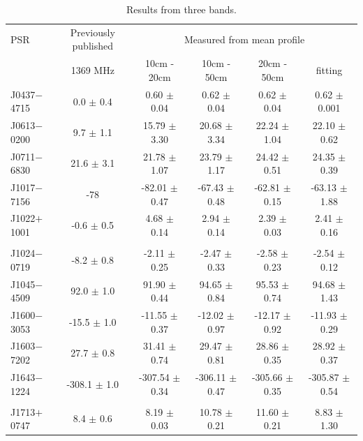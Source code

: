 \documentclass[useAMS,usenatbib]{mn2e}
\begin{document}
\begin{table}
\centering
\caption{Results from three bands.}
\label{rm}
\begin{tabular}{lccccc}
\hline
PSR          &    Previously published     &    \multicolumn{4}{c}{Measured from mean profile}       \\  
             &    1369 MHz                 &    10cm - 20cm  &  10cm - 50cm   &  20cm - 50cm   &    fitting      \\   
\hline
J0437$-$4715 & 0.0    $\pm$ 0.4  & 0.60    $\pm$ 0.04 & 0.62    $\pm$ 0.04 & 0.62    $\pm$ 0.04 & 0.62    $\pm$ 0.001   \\  
J0613$-$0200 & 9.7    $\pm$ 1.1  & 15.79   $\pm$ 3.30 & 20.68   $\pm$ 3.34 & 22.24   $\pm$ 1.04 & 22.10   $\pm$ 0.62    \\  
J0711$-$6830 & 21.6   $\pm$ 3.1  & 21.78   $\pm$ 1.07 & 23.79   $\pm$ 1.17 & 24.42   $\pm$ 0.51 & 24.35   $\pm$ 0.39    \\  
J1017$-$7156 & -78               & -82.01  $\pm$ 0.47 & -67.43  $\pm$ 0.48 & -62.81  $\pm$ 0.15 & -63.13  $\pm$ 1.88   \\
J1022$+$1001 & -0.6   $\pm$ 0.5  & 4.68    $\pm$ 0.14 & 2.94    $\pm$ 0.14 & 2.39    $\pm$ 0.03 & 2.41    $\pm$ 0.16    \\  
             &                   &                    &                    &                    &                       \\
J1024$-$0719 & -8.2   $\pm$ 0.8  & -2.11   $\pm$ 0.25 & -2.47   $\pm$ 0.33 & -2.58   $\pm$ 0.23 & -2.54   $\pm$ 0.12    \\  
J1045$-$4509 & 92.0   $\pm$ 1.0  & 91.90   $\pm$ 0.44 & 94.65   $\pm$ 0.84 & 95.53   $\pm$ 0.74 & 94.68   $\pm$ 1.43    \\  
J1600$-$3053 & -15.5  $\pm$ 1.0  & -11.55  $\pm$ 0.37 & -12.02  $\pm$ 0.97 & -12.17  $\pm$ 0.92 & -11.93  $\pm$ 0.29    \\  
J1603$-$7202 & 27.7   $\pm$ 0.8  & 31.41   $\pm$ 0.74 & 29.47   $\pm$ 0.81 & 28.86   $\pm$ 0.35 & 28.92   $\pm$ 0.37    \\  
J1643$-$1224 & -308.1 $\pm$ 1.0  & -307.54 $\pm$ 0.34 & -306.11 $\pm$ 0.47 & -305.66 $\pm$ 0.35 & -305.87 $\pm$ 0.54    \\   
             &                   &                    &                    &                    &                       \\
J1713$+$0747 & 8.4    $\pm$ 0.6  & 8.19    $\pm$ 0.03 & 10.78   $\pm$ 0.21 & 11.60   $\pm$ 0.21 & 8.83    $\pm$ 1.30    \\  

\end{tabular}
\end{table}
\end{document}
